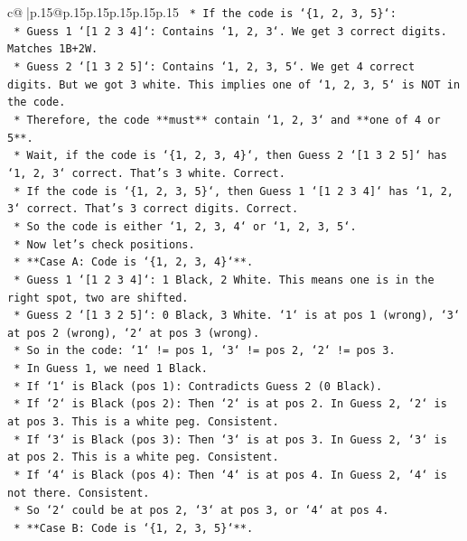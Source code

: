 \documentclass{article}
\begin{document}
{\begin{supertabular}{c@{$\;$}|p{.15\linewidth}@{}p{.15\linewidth}p{.15\linewidth}p{.15\linewidth}p{.15\linewidth}p{.15\linewidth}}
{{{\texttt{    *   If the code is `\{1, 2, 3, 5\}`:} \\
\texttt{        *   Guess 1 `{[}1 2 3 4{]}`: Contains `1, 2, 3`. We get 3 correct digits. Matches 1B+2W.} \\
\texttt{        *   Guess 2 `{[}1 3 2 5{]}`: Contains `1, 2, 3, 5`. We get 4 correct digits. But we got 3 white. This implies one of `1, 2, 3, 5` is NOT in the code.} \\
\texttt{    *   Therefore, the code **must** contain `1, 2, 3` and **one of 4 or 5**.} \\
\texttt{    *   Wait, if the code is `\{1, 2, 3, 4\}`, then Guess 2 `{[}1 3 2 5{]}` has `1, 2, 3` correct. That's 3 white. Correct.} \\
\texttt{    *   If the code is `\{1, 2, 3, 5\}`, then Guess 1 `{[}1 2 3 4{]}` has `1, 2, 3` correct. That's 3 correct digits. Correct.} \\
\texttt{    *   So the code is either `1, 2, 3, 4` or `1, 2, 3, 5`.} \\
\texttt{    *   Now let's check positions.} \\
\texttt{    *   **Case A: Code is `\{1, 2, 3, 4\}`**.} \\
\texttt{        *   Guess 1 `{[}1 2 3 4{]}`: 1 Black, 2 White. This means one is in the right spot, two are shifted.} \\
\texttt{        *   Guess 2 `{[}1 3 2 5{]}`: 0 Black, 3 White. `1` is at pos 1 (wrong), `3` at pos 2 (wrong), `2` at pos 3 (wrong).} \\
\texttt{        *   So in the code: `1` != pos 1, `3` != pos 2, `2` != pos 3.} \\
\texttt{        *   In Guess 1, we need 1 Black.} \\
\texttt{            *   If `1` is Black (pos 1): Contradicts Guess 2 (0 Black).} \\
\texttt{            *   If `2` is Black (pos 2): Then `2` is at pos 2. In Guess 2, `2` is at pos 3. This is a white peg. Consistent.} \\
\texttt{            *   If `3` is Black (pos 3): Then `3` is at pos 3. In Guess 2, `3` is at pos 2. This is a white peg. Consistent.} \\
\texttt{            *   If `4` is Black (pos 4): Then `4` is at pos 4. In Guess 2, `4` is not there. Consistent.} \\
\texttt{        *   So `2` could be at pos 2, `3` at pos 3, or `4` at pos 4.} \\
\texttt{    *   **Case B: Code is `\{1, 2, 3, 5\}`**.} \\
}}}
\end{supertabular}}
\end{document}
